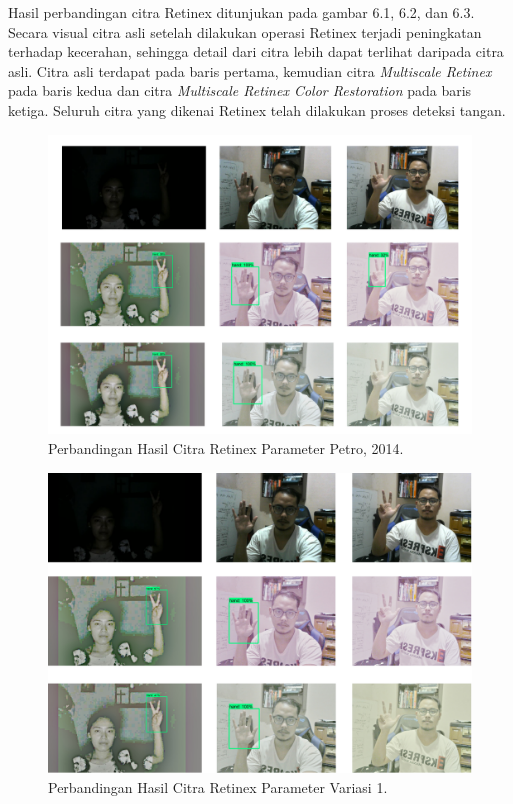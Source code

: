 Hasil perbandingan citra Retinex ditunjukan pada gambar 6.1, 6.2, dan 6.3. Secara visual citra asli setelah dilakukan operasi Retinex terjadi peningkatan terhadap kecerahan, sehingga detail dari citra lebih dapat terlihat daripada citra asli. Citra asli terdapat pada baris pertama, kemudian citra \textit{Multiscale Retinex} pada baris kedua dan citra \textit{Multiscale Retinex Color Restoration} pada baris ketiga. Seluruh citra yang dikenai Retinex telah dilakukan proses deteksi tangan.
\begin{figure}[H]
	\centering
	\includegraphics[width=0.9\linewidth]{ps}
	\caption{Perbandingan Hasil Citra Retinex Parameter Petro, 2014.}
	\label{fig:ps}
\end{figure}
\begin{figure}[H]
	\centering
	\includegraphics[width=0.85\linewidth]{versi1}
	\caption{Perbandingan Hasil Citra Retinex Parameter Variasi 1.}
	\label{fig:ps}
\end{figure}
